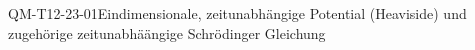 
\begin{CONC}{QM-T12-23-01}{Eindimensionale, zeitunabhängige Potential (Heaviside) und zugehörige zeitunabhäängige Schrödinger Gleichung}
\end{CONC}
